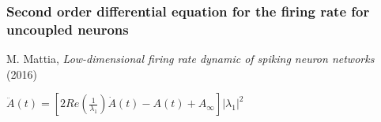 \documentclass{beamer}
\begin{document}
\begin{frame}
\frametitle{ Second order differential equation for the firing rate for uncoupled neurons}

\vspace{1cm}
M. Mattia, \textit{Low-dimensional firing rate dynamic of spiking neuron networks} (2016)

\vspace{1cm}

\hspace{1cm}$\ddot A(t)=[2Re(\frac{1}{\lambda_1})\dot A(t)-A(t)+A_{\infty}] |{\lambda_1}|^2$

\end{frame}
\end{document}
